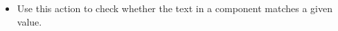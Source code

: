\begin{itemize}
\item Use this action to check whether the text in a component matches a given value. 
\end{itemize}
